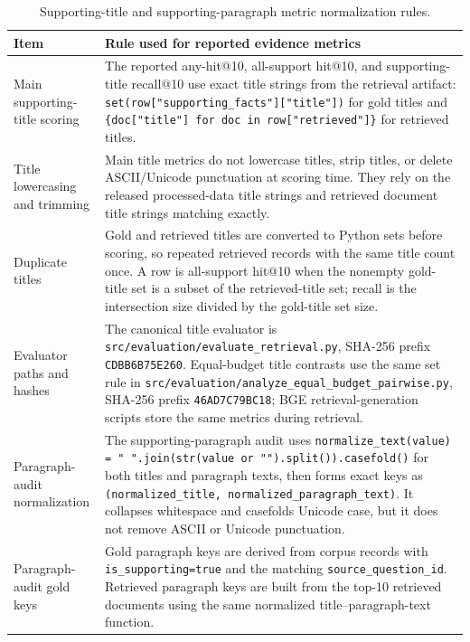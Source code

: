 \documentclass[pdflatex,sn-basic,Numbered]{sn-jnl}
\begin{document}
\begin{table}[t]
\centering
\caption{Supporting-title and supporting-paragraph metric normalization rules.}
\label{tab:supporting_evidence_metric_definition}
\scriptsize
\begin{threeparttable}
\setlength{\tabcolsep}{4pt}
\begin{tabularx}{\textwidth}{>{\raggedright\arraybackslash}p{}
                            >{\raggedright\arraybackslash}X}
\toprule
Item & Rule used for reported evidence metrics \\
\midrule
Main supporting-title scoring & The reported any-hit@10, all-support hit@10, and supporting-title recall@10 use exact title strings from the retrieval artifact: \texttt{set(row["supporting\_facts"]["title"])} for gold titles and \texttt{\{doc["title"] for doc in row["retrieved"]\}} for retrieved titles. \\
Title lowercasing and trimming & Main title metrics do not lowercase titles, strip titles, or delete ASCII/Unicode punctuation at scoring time. They rely on the released processed-data title strings and retrieved document title strings matching exactly. \\
Duplicate titles & Gold and retrieved titles are converted to Python sets before scoring, so repeated retrieved records with the same title count once. A row is all-support hit@10 when the nonempty gold-title set is a subset of the retrieved-title set; recall is the intersection size divided by the gold-title set size. \\
Evaluator paths and hashes & The canonical title evaluator is \texttt{src/evaluation/evaluate\_retrieval.py}, SHA-256 prefix \texttt{CDBB6B75E260}. Equal-budget title contrasts use the same set rule in \texttt{src/evaluation/analyze\_equal\_budget\_pairwise.py}, SHA-256 prefix \texttt{46AD7C79BC18}; BGE retrieval-generation scripts store the same metrics during retrieval. \\
Paragraph-audit normalization & The supporting-paragraph audit uses \texttt{normalize\_text(value) = " ".join(str(value or "").split()).casefold()} for both titles and paragraph texts, then forms exact keys as \texttt{(normalized\_title, normalized\_paragraph\_text)}. It collapses whitespace and casefolds Unicode case, but it does not remove ASCII or Unicode punctuation. \\
Paragraph-audit gold keys & Gold paragraph keys are derived from corpus records with \texttt{is\_supporting=true} and the matching \texttt{source\_question\_id}. Retrieved paragraph keys are built from the top-10 retrieved documents using the same normalized title--paragraph-text function. \\

\end{tabularx}
\end{threeparttable}
\end{table}
\end{document}
